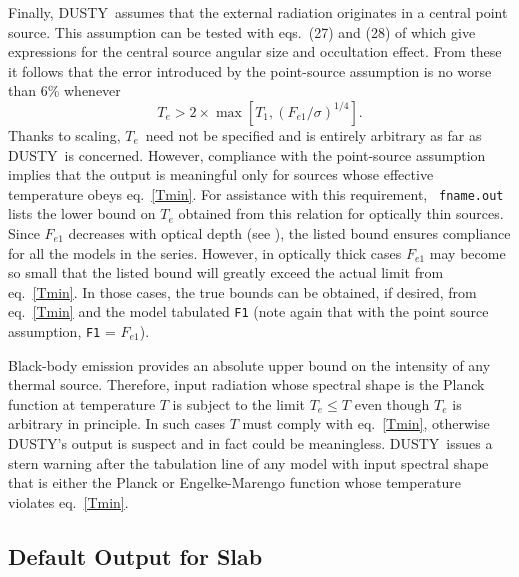 \documentclass[11pt]{article}
\def\D  {{\sf DUSTY}}
\def\eq#1{\begin{equation} #1 \end{equation}}
\def\Te   {\hbox{$T_e$}}
\begin{document}
Finally, \D\ assumes that the external radiation originates in a central point
source. This assumption can be tested with eqs.\ (27) and (28) of \cite{IE97}
which give expressions for the central source angular size and occultation
effect. From these it follows that the error introduced by the point-source
assumption is no worse than 6\% whenever
\eq{\label{Tmin}
        T_e > 2\times\max[T_1, (F_{e1}/\sigma)^{1/4}].
}
Thanks to scaling, \Te\ need not be specified and is entirely arbitrary as far
as \D\ is concerned. However, compliance with the point-source assumption
implies that the output is meaningful only for sources whose effective
temperature obeys eq.\ \ref{Tmin}. For assistance with this requirement, {\tt
fname.out} lists the lower bound on $T_e$ obtained from this relation for
optically thin sources. Since $F_{e1}$ decreases with optical depth (see
\cite{IE97}), the listed bound ensures compliance for all the models in the
series. However, in optically thick cases $F_{e1}$ may become so small that the
listed bound will greatly exceed the actual limit from eq.\ \ref{Tmin}. In
those cases, the true bounds can be obtained, if desired, from eq.\ \ref{Tmin}
and the model tabulated {\tt F1} (note again that with the point source
assumption, {\tt F1} = $F_{e1}$).

Black-body emission provides an absolute upper bound on the intensity of any
thermal source. Therefore, input radiation whose spectral shape is the Planck
function at temperature $T$ is subject to the limit $T_e \le T$ even though
$T_e$ is arbitrary in principle. In such cases $T$ must comply with eq.\
\ref{Tmin}, otherwise \D's output is suspect and in fact could be meaningless.
\D\ issues a stern warning after the tabulation line of any model with input
spectral shape that is either the Planck or Engelke-Marengo function whose
temperature violates eq.\ \ref{Tmin}.

\subsection{Default Output for Slab}
\label{default_slb}
\end{document}
